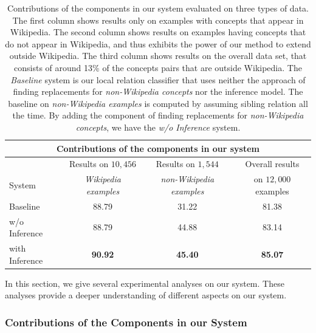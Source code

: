 \begin{table}[!t]
  \begin{center}
    \begin{tabular}{|l||c|c|c|}
      \hline
      \multicolumn{4}{|c|}{Contributions of the components in our system} \\
      \hline
      &         Results on $10,456$  &  Results on $1,544$              &         Overall results  \\
      System &  {\em Wikipedia examples}  &  {\em non-Wikipedia examples}  &  on $12,000$ examples  \\
      \hline
      \hline
      Baseline        &                       88.79  &                      31.22       &                   81.38  \\
      \hline
      w/o Inference   &                       88.79  &                      44.88       &                   83.14  \\
      \hline
      with Inference  &                       \textbf{90.92}  &                      \textbf{45.40}       &                   \textbf{85.07}  \\
      \hline
    \end{tabular}
    \caption{Contributions of the components in our system evaluated
      on three types of data. The first column shows results only on
      examples with concepts that appear in Wikipedia. The second
      column shows results on examples having concepts that do not
      appear in Wikipedia, and thus exhibits the power of our method
      to extend outside Wikipedia. The third column shows results on
      the overall data set, that consists of around 13\% of the
      concepts pairs that are outside Wikipedia. The {\em Baseline}
      system is our local relation classifier that uses neither the
      approach of finding replacements for {\em non-Wikipedia
        concepts} nor the inference model. The baseline on {\em
        non-Wikipedia examples} is computed by assuming sibling
      relation all the time. By adding the component of finding
      replacements for {\em non-Wikipedia concepts}, we have the {\em
        w/o Inference} system.}
    \label{tab:w-wo-infer}
  \end{center}
\end{table}

In this section, we give several experimental analyses on our system.
These analyses provide a deeper understanding of different aspects on
our system.

\subsubsection{Contributions of the Components in our System}

